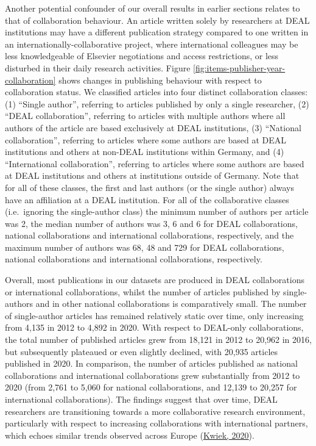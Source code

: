 \documentclass[
]{article}
\begin{document}
Another potential confounder of our overall results in earlier sections relates to that of collaboration behaviour. An article written solely by researchers at DEAL institutions may have a different publication strategy compared to one written in an internationally-collaborative project, where international colleagues may be less knowledgeable of Elsevier negotiations and access restrictions, or less disturbed in their daily research activities. Figure \ref{fig:items-publisher-year-collaboration} shows changes in publishing behaviour with respect to collaboration status. We classified articles into four distinct collaboration classes: (1) ``Single author'', referring to articles published by only a single researcher, (2) ``DEAL collaboration'', referring to articles with multiple authors where all authors of the article are based exclusively at DEAL institutions, (3) ``National collaboration'', referring to articles where some authors are based at DEAL institutions and others at non-DEAL institutions within Germany, and (4) ``International collaboration'', referring to articles where some authors are based at DEAL institutions and others at institutions outside of Germany. Note that for all of these classes, the first and last authors (or the single author) always have an affiliation at a DEAL institution. For all of the collaborative classes (i.e.~ignoring the single-author class) the minimum number of authors per article was 2, the median number of authors was 3, 6 and 6 for DEAL collaborations, national collaborations and international collaborations, respectively, and the maximum number of authors was 68, 48 and 729 for DEAL collaborations, national collaborations and international collaborations, respectively.

Overall, most publications in our datasets are produced in DEAL collaborations or international collaborations, whilst the number of articles published by single-authors and in other national collaborations is comparatively small. The number of single-author articles has remained relatively static over time, only increasing from 4,135 in 2012 to 4,892 in 2020. With respect to DEAL-only collaborations, the total number of published articles grew from 18,121 in 2012 to 20,962 in 2016, but subsequently plateaued or even slightly declined, with 20,935 articles published in 2020. In comparison, the number of articles published as national collaborations and international collaborations grew substantially from 2012 to 2020 (from 2,761 to 5,060 for national collaborations, and 12,139 to 20,257 for international collaborations). The findings suggest that over time, DEAL researchers are transitioning towards a more collaborative research environment, particularly with respect to increasing collaborations with international partners, which echoes similar trends observed across Europe (\href{https://doi.org/10.1080/03075079.2020.1749254}{Kwiek, 2020}).
\end{document}
